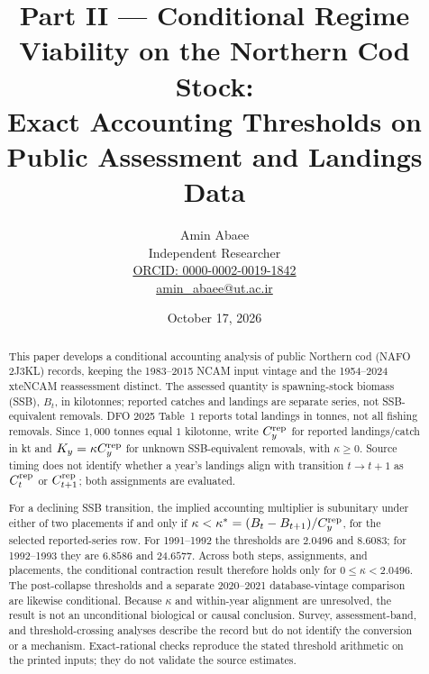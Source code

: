\documentclass[10pt,twocolumn]{article}
\theoremstyle{plain}
\theoremstyle{remark}
\begin{document}
\title{Part II --- Conditional Regime Viability on the Northern Cod Stock:\\
Exact Accounting Thresholds on Public Assessment and Landings Data}
\author{Amin Abaee\\[0.35em]
{\small Independent Researcher}\\[0.55em]
{\small\href{https://orcid.org/0000-0002-0019-1842}{ORCID: 0000-0002-0019-1842}}\\[0.3em]
{\small\href{mailto:amin\_abaee@ut.ac.ir}{amin\_abaee@ut.ac.ir}}}
\date{October 17, 2026}
\maketitle

\begin{abstract}
This paper develops a conditional accounting analysis of public Northern cod (NAFO 2J3KL) records, keeping the 1983--2015 NCAM input vintage and the 1954--2024 xteNCAM reassessment distinct. The assessed quantity is spawning-stock biomass (SSB), \(B_t\), in kilotonnes; reported catches and landings are separate series, not SSB-equivalent removals. DFO 2025 Table~1 reports total landings in tonnes, not all fishing removals. Since \(1{,}000\) tonnes equal \(1\) kilotonne, write \(C_y^{\rm rep}\) for reported landings/catch in kt and \(K_y=\kappa C_y^{\rm rep}\) for unknown SSB-equivalent removals, with \(\kappa\ge0\). Source timing does not identify whether a year's landings align with transition \(t\to t+1\) as \(C_t^{\rm rep}\) or \(C_{t+1}^{\rm rep}\); both assignments are evaluated.

For a declining SSB transition, the implied accounting multiplier is subunitary under either of two placements if and only if \(\kappa<\kappa^*=(B_t-B_{t+1})/C_y^{\rm rep}\), for the selected reported-series row. For 1991--1992 the thresholds are \(2.0496\) and \(8.6083\); for 1992--1993 they are \(6.8586\) and \(24.6577\). Across both steps, assignments, and placements, the conditional contraction result therefore holds only for \(0\le\kappa<2.0496\). The post-collapse thresholds and a separate 2020--2021 database-vintage comparison are likewise conditional. Because \(\kappa\) and within-year alignment are unresolved, the result is not an unconditional biological or causal conclusion. Survey, assessment-band, and threshold-crossing analyses describe the record but do not identify the conversion or a mechanism. Exact-rational checks reproduce the stated threshold arithmetic on the printed inputs; they do not validate the source estimates.
\end{abstract}
\end{document}
